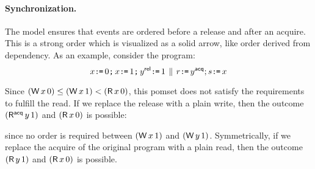 \paragraph{Synchronization.}
The model ensures that events are ordered before a release and after an
acquire.  This is a strong order which is visualized as a solid arrow, like
order derived from dependency.  As an example, consider the program:
\begin{displaymath}
  x\GETS0\SEMI %
  x\GETS 1\SEMI y \REL\GETS1 \PAR r\GETS y\ACQ; s\GETS x
\end{displaymath}
  \hfill
\begin{tikzinline}[node distance=1em]
\end{tikzinline}
\hfill{}\hfill
\begin{tikzinline}[node distance=1em, baseline={([yshift=-1.5ex]current bounding box.west)}]
\end{tikzinline}
\hfill\hbox{}

\smallskip
\noindent
Since $(\DW x0) \gtN (\DW x1) \lt (\DR x0)$, this pomset does not satisfy the
requirements to fulfill the read.
If we replace the release
with a plain write, then the outcome $(\DRAcq y1)$ and $(\DR x0)$ is possible:
\begin{tikzdisplay}[node distance=1em]
\end{tikzdisplay}
since no order is required between $(\DW x1)$ and $(\DW y1)$.  
Symmetrically, if we replace the acquire of the original program
with a plain read, then the outcome $(\DR y1)$ and $(\DR x0)$ is possible.

